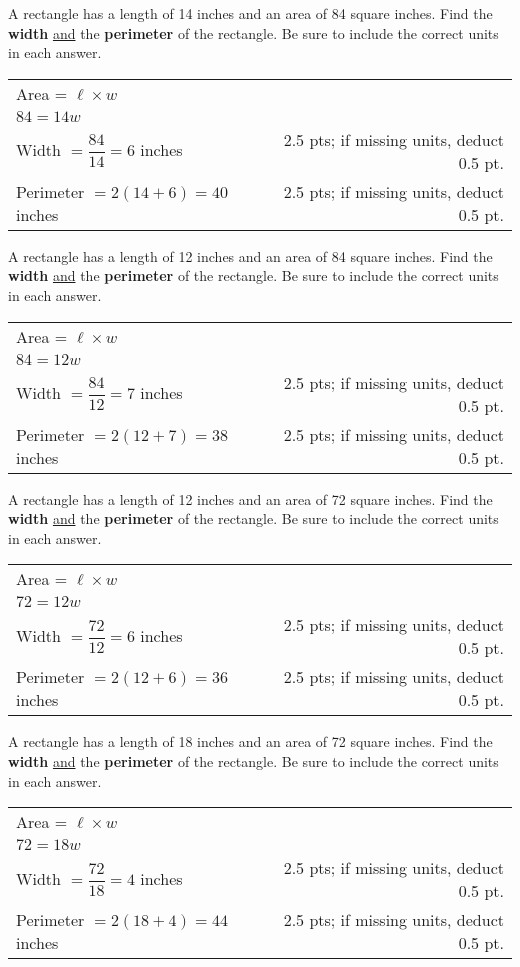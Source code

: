 {
	A rectangle has a length of 14 inches and an area of 84 square inches. Find the {\bf width} \underline{and} the {\bf perimeter} of the rectangle.  Be sure to include the correct units in each answer.
}
{
	\begin{tabular}{l r}
	Area = $\ell \times w $ \\  
	$84=14w$\\
	Width $=\dfrac{84}{14}=6$ inches  & 2.5 pts; if missing units, deduct 0.5 pt. \\ 
	Perimeter $=2(14+6)=40$ inches&2.5 pts; if missing units, deduct 0.5 pt.
	\end{tabular}
}

{
	A rectangle has a length of 12 inches and an area of 84 square inches. Find the {\bf width} \underline{and} the {\bf perimeter} of the rectangle.  Be sure to include the correct units in each answer.
}
{
	\begin{tabular}{l r}
	Area = $\ell \times w $ \\  
	$84=12w$\\
	Width $=\dfrac{84}{12}=7$ inches  & 2.5 pts; if missing units, deduct 0.5 pt. \\ 
	Perimeter $=2(12+7)=38$ inches&2.5 pts; if missing units, deduct 0.5 pt.
	\end{tabular}
}

{
	A rectangle has a length of 12 inches and an area of 72 square inches. Find the {\bf width} \underline{and} the {\bf perimeter} of the rectangle.  Be sure to include the correct units in each answer.
}
{
	\begin{tabular}{l r}
	Area = $\ell \times w $ \\  
	$72=12w$\\
	Width $=\dfrac{72}{12}=6$ inches  & 2.5 pts; if missing units, deduct 0.5 pt. \\ 
	Perimeter $=2(12+6)=36$ inches&2.5 pts; if missing units, deduct 0.5 pt.
	\end{tabular}
}

{
	A rectangle has a length of 18 inches and an area of 72 square inches. Find the {\bf width} \underline{and} the {\bf perimeter} of the rectangle.  Be sure to include the correct units in each answer.
}
{
	\begin{tabular}{l r}
	Area = $\ell \times w $ \\  
	$72=18w$\\
	Width $=\dfrac{72}{18}=4$ inches  & 2.5 pts; if missing units, deduct 0.5 pt. \\ 
	Perimeter $=2(18+4)=44$ inches&2.5 pts; if missing units, deduct 0.5 pt.
	\end{tabular}
}
